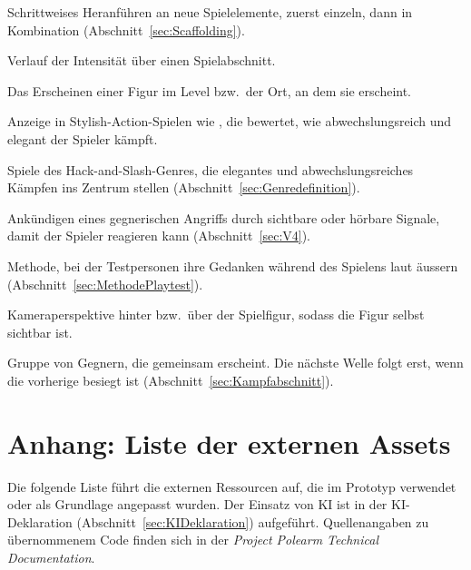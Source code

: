 \documentclass[../Main.tex]{subfiles}
\begin{document}
\begin{description}[style=unboxed, leftmargin=0cm, itemsep=0.3em]
\item[Scaffolding] Schrittweises Heranführen an neue Spielelemente, zuerst einzeln, dann in Kombination (Abschnitt~\ref{sec:Scaffolding}).
\item[Spannungskurve] Verlauf der Intensität über einen Spielabschnitt.
\item[Spawn, Spawnpunkt] Das Erscheinen einer Figur im Level bzw.\ der Ort, an dem sie erscheint.
\item[Stylemeter] Anzeige in Stylish-Action-Spielen wie , die bewertet, wie abwechslungsreich und elegant der Spieler kämpft.
\item[Stylish-Action] Spiele des Hack-and-Slash-Genres, die elegantes und abwechslungsreiches Kämpfen ins Zentrum stellen (Abschnitt~\ref{sec:Genredefinition}).
\item[Telegrafieren] Ankündigen eines gegnerischen Angriffs durch sichtbare oder hörbare Signale, damit der Spieler reagieren kann (Abschnitt~\ref{sec:V4}).
\item[Think-aloud] Methode, bei der Testpersonen ihre Gedanken während des Spielens laut äussern (Abschnitt~\ref{sec:MethodePlaytest}).
\item[Third-Person-Perspektive] Kameraperspektive hinter bzw.\ über der Spielfigur, sodass die Figur selbst sichtbar ist.
\item[Welle] Gruppe von Gegnern, die gemeinsam erscheint. Die nächste Welle folgt erst, wenn die vorherige besiegt ist (Abschnitt~\ref{sec:Kampfabschnitt}).
\end{description}

\newpage
\section{Anhang: Liste der externen Assets} \label{sec:Assets}

Die folgende Liste führt die externen Ressourcen auf, die im Prototyp verwendet oder als Grundlage angepasst wurden. Der Einsatz von KI ist in der KI-Deklaration (Abschnitt~\ref{sec:KIDeklaration}) aufgeführt. Quellenangaben zu übernommenem Code finden sich in der \textit{Project Polearm Technical Documentation}.
\end{document}
